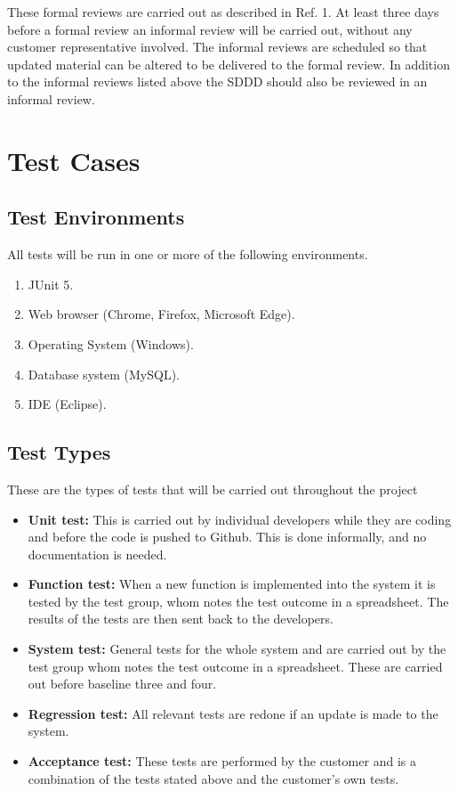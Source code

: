 \documentclass{article}
\begin{document}
\noindent
These formal reviews are carried out as described in Ref. 1. At least three days before a formal review an informal review will be carried out, without any customer representative involved. The informal reviews are scheduled so that updated material can be altered to be delivered to the formal review. In addition to the informal reviews listed above the SDDD should also be reviewed in an informal review. 

\section{Test Cases}
	\subsection{Test Environments}
	All tests will be run in one or more of the following environments. 
		\begin{enumerate}
			\item JUnit 5.

			\item Web browser (Chrome, Firefox, Microsoft Edge).

			\item Operating System (Windows).

			\item Database system (MySQL).

			\item IDE (Eclipse).	
		\end{enumerate}
		
		\subsection{Test Types}
		
These are the types of tests that will be carried out throughout the project


\begin{itemize}
  \item \textbf{Unit test:} This is carried out by individual developers while they are coding and before the code is pushed to Github. This is done informally, and no documentation is needed.
  
  \item \textbf{Function test:} When a new function is implemented into the system it is tested by the test group, whom notes the test outcome in a spreadsheet. The results of the tests are then sent back to the developers.
  
   \item \textbf{System test:} General tests for the whole system and are carried out by the test group whom notes the test outcome in a spreadsheet. These are carried out before baseline three and four.
   
      \item \textbf{Regression test:} All relevant tests are redone if an update is made to the system.
      
         \item \textbf{Acceptance test:} These tests are performed by the customer and is a combination of the tests stated above and the customer's own tests.
\end{itemize}
\end{document}
